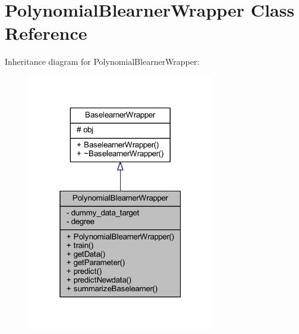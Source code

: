 \hypertarget{class_polynomial_blearner_wrapper}{}\section{Polynomial\+Blearner\+Wrapper Class Reference}
\label{class_polynomial_blearner_wrapper}


Inheritance diagram for Polynomial\+Blearner\+Wrapper\+:\nopagebreak
\begin{figure}[H]
\begin{center}
\leavevmode
\includegraphics[width=232pt]{class_polynomial_blearner_wrapper__inherit__graph}
\end{center}
\end{figure}


